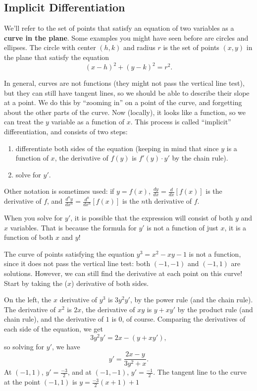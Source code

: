 \subsection{Implicit Differentiation}

We'll refer to the set of points that satisfy an equation of two variables as a \textbf{curve in the plane}. Some examples you might have seen before are circles and ellipses. The circle with center $(h,k)$ and radius $r$ is the set of points $(x,y)$ in the plane that satisfy the equation
$$(x-h)^2+(y-k)^2=r^2.$$

In general, curves are not functions (they might not pass the vertical line test), but they can still have tangent lines, so we should be able to describe their slope at a point. We do this by ``zooming in'' on a point of the curve, and forgetting about the other parts of the curve. Now (locally), it looks like a function, so we can treat the $y$ variable as a function of $x$. This process is called ``implicit'' differentiation, and consists of two steps:
\begin{enumerate}
\item differentiate both sides of the equation (keeping in mind that since $y$ is a function of $x$, the derivative of $f(y)$ is $f'(y)\cdot y'$ by the chain rule).
\item solve for $y'$.
\end{enumerate}

Other notation is sometimes used: if $y=f(x)$, $\frac{dy}{dx}=\frac{d}{dx}[f(x)]$ is the derivative of $f$, and $\frac{d^ny}{dx^n}=\frac{d^n}{dx^n}[f(x)]$ is the $n$th derivative of $f$.

When you solve for $y'$, it is possible that the expression will consist of both $y$ and $x$ variables. That is because the formula for $y'$ is not a function of just $x$, it is a function of both $x$ and $y$!

\begin{exampleblock}
The curve of points satisfying the equation $y^{3}=x^{2}-xy-1$ is not a function, since it does not pass the vertical line test: both $(-1,-1)$ and $(-1,1)$ are solutions. However, we can still find the derivative at each point on this curve! Start by taking the ($x$) derivative of both sides.

On the left, the $x$ derivative of $y^3$ is $3y^2y'$, by the power rule (and the chain rule). The derivative of $x^2$ is $2x$, the derivative of $xy$ is $y+xy'$ by the product rule (and chain rule), and the derivative of $1$ is 0, of course. Comparing the derivatives of each side of the equation, we get
$$3y^2y'=2x-(y+xy'),$$
so solving for $y'$, we have
$$y'=\frac{2x-y}{3y^2+x}.$$
At $(-1,1)$, $y'=\frac{-3}{2}$, and at $(-1,-1)$, $y'=\frac{-1}{2}$. The tangent line to the curve at the point $(-1,1)$ is $y=\frac{-3}{2}(x+1)+1$

\end{exampleblock}

